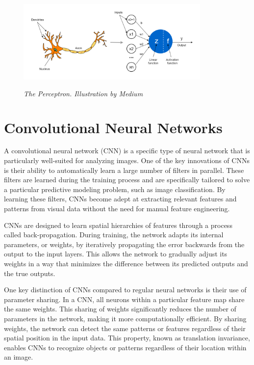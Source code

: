 \newpage

\begin{figure}[H]
  \centering
  \includegraphics[width=0.85\textwidth]{imatges/preliminaries/perceptron.png}
  \caption[The Perceptron]{\textit{The Perceptron. Illustration by Medium}}
  {\label{fig:perceptron}}
\end{figure}


\section{Convolutional Neural Networks}

A convolutional neural network (CNN) is a specific type of neural network that
is particularly well-suited for analyzing images. One of the key innovations of
CNNs is their ability to automatically learn a large number of filters in
parallel. These filters are learned during the training process and are
specifically tailored to solve a particular predictive modeling problem, such
as image classification. By learning these filters, CNNs become adept at
extracting relevant features and patterns from visual data without the need for
manual feature engineering. \newline

CNNs are designed to learn spatial hierarchies of features through a process
called back-propagation. During training, the network adapts its internal
parameters, or weights, by iteratively propagating the error backwards from the
output to the input layers. This allows the network to gradually adjust its
weights in a way that minimizes the difference between its predicted outputs
and the true outputs. \newline

One key distinction of CNNs compared to regular neural networks is their use of
parameter sharing. In a CNN, all neurons within a particular feature map share
the same weights. This sharing of weights significantly reduces the number of
parameters in the network, making it more computationally efficient. By sharing
weights, the network can detect the same patterns or features regardless of
their spatial position in the input data. This property, known as translation
invariance, enables CNNs to recognize objects or patterns regardless of their
location within an image.\newline


